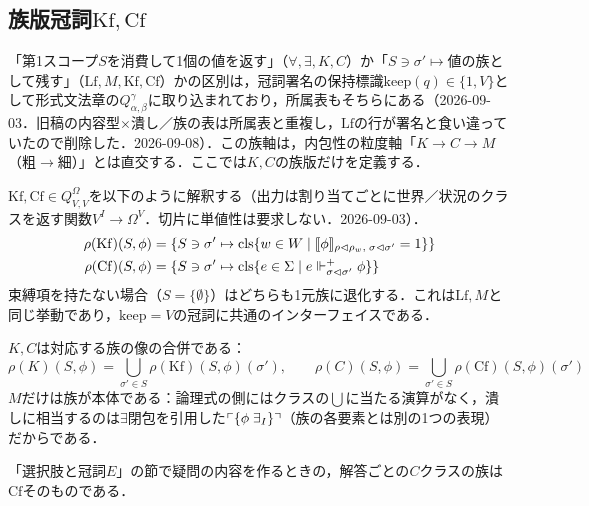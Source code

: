 \documentclass[../../main-detail.tex]{subfiles}
\begin{document}
\subsection{族版冠詞$\mathrm{Kf},\mathrm{Cf}$}\label{subsec:s-index}
「第1スコープ$S$を消費して1個の値を返す」（$\forall,\exists,K,C$）か「$S\ni\sigma'\mapsto$値の族として残す」（$\mathrm{Lf},M,\mathrm{Kf},\mathrm{Cf}$）かの区別は，冠詞署名の保持標識$\mathrm{keep}(q)\in\{1,V\}$として形式文法章の$Q^\gamma_{\alpha,\beta}$に取り込まれており，所属表もそちらにある（2026-09-03．旧稿の内容型$\times$潰し／族の表は所属表と重複し，$\mathrm{Lf}$の行が署名と食い違っていたので削除した．2026-09-08）．この族軸は，内包性の粒度軸「$K\to C\to M$（粗$\to$細）」とは直交する．ここでは$K,C$の族版だけを定義する．
\begin{definition}[族版冠詞]
    $\mathrm{Kf}, \mathrm{Cf} \in Q^\Omega_{V,V}$を以下のように解釈する（出力は割り当てごとに世界／状況のクラスを返す関数$V^I\to\Omega^V$．切片に単値性は要求しない．2026-09-03）．
    \begin{align*}
        \rho(\mathrm{Kf})(S, \phi) &= \{S\ni\sigma' \mapsto \mathrm{cls}\{w \in W \mid \llbracket\phi\rrbracket_{\rho\vartriangleleft\rho_w,\; \sigma\vartriangleleft\sigma'} = 1\}\}\\
        \rho(\mathrm{Cf})(S, \phi) &= \{S\ni\sigma' \mapsto \mathrm{cls}\{e \in \Sigma \mid e \Vdash^{+}_{\sigma\vartriangleleft\sigma'} \phi\}\}
    \end{align*}
    束縛項を持たない場合（$S = \{\emptyset\}$）はどちらも1元族に退化する．これは$\mathrm{Lf}, M$と同じ挙動であり，$\mathrm{keep}=V$の冠詞に共通のインターフェイスである．
\end{definition}
\begin{remark}[潰しは族から回復できる]
    $K, C$は対応する族の像の合併である：
    \[
        \rho(K)(S,\phi) = \bigcup_{\sigma'\in S} \rho(\mathrm{Kf})(S,\phi)(\sigma'),\qquad
        \rho(C)(S,\phi) = \bigcup_{\sigma'\in S} \rho(\mathrm{Cf})(S,\phi)(\sigma')
    \]
    $M$だけは族が本体である：論理式の側にはクラスの$\bigcup$に当たる演算がなく，潰しに相当するのは$\exists$閉包を引用した$\ulcorner \{\phi\;\exists_I\} \urcorner$（族の各要素とは別の1つの表現）だからである．
\end{remark}
\begin{remark}[用途]
    「選択肢と冠詞$E$」の節で疑問の内容を作るときの，解答ごとの$C$クラスの族は$\mathrm{Cf}$そのものである．
\end{remark}
\end{document}

